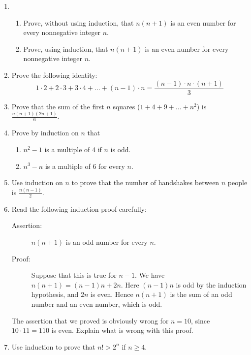 \documentclass{article}
\begin{document}
\begin{enumerate}
\item \begin{enumerate}
	\item Prove\marginpar{[6]}, without using induction, that $n(n+1)$ is an even number for every nonnegative integer $n$.
	\item Prove, using induction, that $n(n+1)$ is an even number for every nonnegative integer $n$.
	\end{enumerate}
\item Prove\marginpar{[3]} the following identity:
\begin{equation*}
1\cdot 2+2\cdot 3+3\cdot 4+\ldots+(n-1)\cdot n=\dfrac{(n-1)\cdot n\cdot(n+1)}{3}
\end{equation*}
\item Prove\marginpar{[3]} that the sum of the first $n$ squares ($1+4+9+\ldots+n^2$) is $\tfrac{n(n+1)(2n+1)}{6}$.
\item Prove\marginpar{[6]} by induction on $n$ that
	\begin{enumerate}
	\item $n^2-1$ is a multiple of 4 if $n$ is odd.
	\item $n^3-n$ is a multiple of 6 for every $n$.
	\end{enumerate}
\item Use\marginpar{[3]} induction on $n$ to prove that the number of handshakes between $n$ people is $\tfrac{n(n-1)}{2}$.
\item Read\marginpar{[2]} the following induction proof carefully:
	\begin{description}
	\item[Assertion:] $n(n+1)$ is an odd number for every $n$.
	\item[Proof:] Suppose that this is true for $n-1$. We have $n(n+1)=(n-1)n+2n$. Here $(n-1)n$ is odd by the induction hypothesis, and $2n$ is even. Hence $n(n+1)$ is the sum of an odd number and an even number, which is odd.
	\end{description}
The assertion that we proved is obviously wrong for $n=10$, since $10\cdot 11=110$ is even. Explain what is wrong with this proof.
\item Use\marginpar{[3]} induction to prove that $n!>2^n$ if $n\geq 4$.
\end{enumerate}
\hrulefill\\
\label{end}
\end{document}
